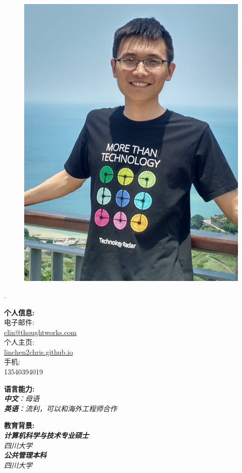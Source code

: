 \documentclass[a3paper,12pt,final]{memoir}
\newcommand{\myThemeColor}{RoyalBlue}
\newcommand{\SmallSep}{\vspace{0.9em}}
\newcommand{\CVItem}[1]
	{\textbf{\color{\myThemeColor} #1}}
\begin{document}
\begin{CJK*}{UTF8}{gbsn}%
\begin{figure}
	\hfill
	\includegraphics[width=0.7\columnwidth]{photo}
	\vspace{-7cm}
\end{figure}
\begin{flushright}\footnotesize
.\\
\vskip 6cm
\raggedright
\CVItem{{\large 个人信息:}}\\
电子邮件:\\
	\href{mailto:clin@thoughtworks.com}{clin@thoughtworks.com}  \\
	个人主页:\\
	\href{http://linchen2chris.github.io/}{linchen2chris.github.io} \\
	手机:\\ 13540394019	
  
	\CVItem{{\large 语言能力:}}\\
  \SmallSep
	\textit{\textbf{中文}：母语 \\\textbf{英语}：流利，可以和海外工程师合作\\}
	
  \vskip 1cm
  \CVItem{{\large 教育背景:}}\\
  \SmallSep
	\textit{\textbf{计算机科学与技术专业硕士}\\
    四川大学\\
    \textbf{公共管理本科}\\
    四川大学\\}


\end{flushright}
\end{CJK*}
\end{document}
